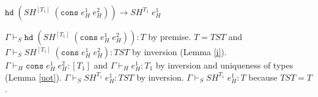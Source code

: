 \begin{case}
$\mathtt{hd}\;(SH^{[T_{1}]}\;(\mathtt{cons}\;e_{H}^{1}\;e_{H}^{2}))\rightarrow SH^{T_{1}}\;e_{H}^{1}$

$\Gamma\vdash_{S}\mathtt{hd}\;(SH^{[T_{1}]}\;(\mathtt{cons}\;e_{H}^{1}\;e_{H}^{2})):T$ by premise.  $T=TST$ and $\Gamma\vdash_{S}SH^{[T_{1}]}\;(\mathtt{cons}\;e_{H}^{1}\;e_{H}^{2}):TST$ by inversion (Lemma \ref{i}).  $\Gamma\vdash_{H}\mathtt{cons}\;e_{H}^{1}\;e_{H}^{2}:[T_{1}]$ and $\Gamma\vdash_{H}e_{H}^{1}:T_{1}$ by inversion and uniqueness of types (Lemma \ref{uot}).  $\Gamma\vdash_{S}SH^{T_{1}}\;e_{H}^{1}:TST$ by inversion.  $\Gamma\vdash_{S}SH^{T_{1}}\;e_{H}^{1}:T$ because $TST=T$.
\end{case}